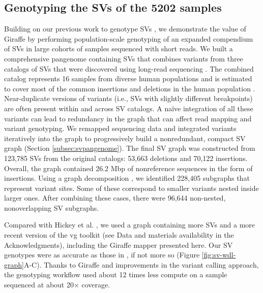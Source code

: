 \documentclass[11pt]{ucscthesis}
\begin{document}
\subsection{Genotyping the SVs of the 5202 samples}
Building on our previous work to genotype SVs \cite{hickey_vgsv_2020}, we demonstrate the value of Giraffe by performing population-scale genotyping of an expanded compendium of SVs in large cohorts of samples sequenced with short reads.
We built a comprehensive pangenome containing SVs that combines variants from three catalogs of SVs that were discovered using long-read sequencing \cite{zook_robust_2020,chaisson_sv_2019,audano_hgsvc}.
The combined catalog represents 16 samples from diverse human populations and is estimated to cover most of the common insertions and deletions in the human population \cite{audano_hgsvc}.
Near-duplicate versions of variants (i.e., SVs with slightly different breakpoints) are often present within and across SV catalogs.
A naïve integration of all these variants can lead to redundancy in the graph that can affect read mapping and variant genotyping.
We remapped sequencing data and integrated variants iteratively into the graph to progressively build a nonredundant, compact SV graph (Section \ref{subsec:svpangenome}).
The final SV graph was constructed from 123,785 SVs from the original catalogs: 53,663 deletions and 70,122 insertions.
Overall, the graph contained 26.2 Mbp of nonreference sequences in the form of insertions. Using a graph decomposition \cite{paten_superbubbles_2018}, we identified 228,405 subgraphs that represent variant sites.
Some of these correspond to smaller variants nested inside larger ones. After combining these cases, there were 96,644 non-nested, nonoverlapping SV subgraphs.

Compared with Hickey et al. \cite{hickey_vgsv_2020}, we used a graph containing more SVs and a more recent version of the vg toolkit (see Data and materials availability in the Acknowledgments), including the Giraffe mapper presented here. Our SV genotypes were as accurate as those in \cite{hickey_vgsv_2020}, if not more so (Figure \ref{fig:sv-wdl-graph}A-C).
Thanks to Giraffe and improvements in the variant calling approach, the genotyping workflow used about 12 times less compute on a sample sequenced at about 20× coverage.
\end{document}
